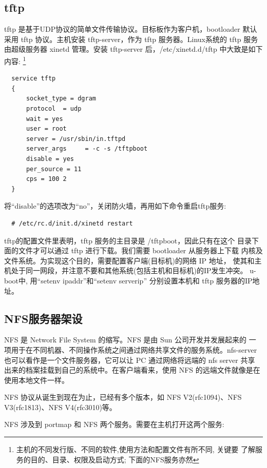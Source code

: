 \subsection{tftp}
    tftp 是基于UDP协议的简单文件传输协议。目标板作为客户机，bootloader 默认
采用 tftp 协议。主机安装 tftp-server，作为 tftp 服务器。Linux系统的 tftp
服务由超级服务器 xinetd 管理。安装 tftp-server 后，/etc/xinetd.d/tftp
中大致是如下内容:
\footnote{主机的不同发行版、不同的软件,使用方法和配置文件有所不同, 关键要
了解服务的目的、目录、权限及启动方式; 下面的NFS服务亦然}

\begin{verbatim}
  service tftp
  { 
      socket_type = dgram
      protocol  = udp
      wait = yes
      user = root
      server = /usr/sbin/in.tftpd
      server_args     = -c -s /tftpboot
      disable = yes
      per_source = 11
      cps = 100 2
  }
\end{verbatim}

    将``disable''的选项改为``no''，关闭防火墙，再用如下命令重启tftp服务:

\begin{boxedminipage}{.9\textwidth}
\begin{verbatim}
  # /etc/rc.d/init.d/xinetd restart
\end{verbatim}
\end{boxedminipage}

	tftp的配置文件里表明，tftp 服务的主目录是 /tftpboot，因此只有在这个
目录下面的文件才可以通过 tftp 进行下载。我们需要 bootloader 从服务器上下载
内核及文件系统。为实现这个目的，需要配置客户端(目标机)的网络 IP 地址，
使其和主机处于同一网段，并注意不要和其他系统(包括主机和目标机)的IP发生冲突。
u-boot中, 用``setenv ipaddr''和``setenv serverip'' 分别设置本机和 tftp
服务器的IP地址。

\subsection{NFS服务器架设}
      NFS 是 Network File System 的缩写。NFS 是由 Sun 公司开发并发展起来的
一项用于在不同机器、不同操作系统之间通过网络共享文件的服务系统。nfs-server
也可以看作是一个文件服务器，它可以让 PC 通过网络将远端的 nfs server 共享
出来的档案挂载到自己的系统中。在客户端看来，使用 NFS 的远端文件就像是在
使用本地文件一样。

    NFS 协议从诞生到现在为止，已经有多个版本，如 NFS V2(rfc1094)、NFS
V3(rfc1813)、NFS V4(rfc3010)等。

    NFS 涉及到 portmap 和 NFS 两个服务。需要在主机打开这两个服务:

